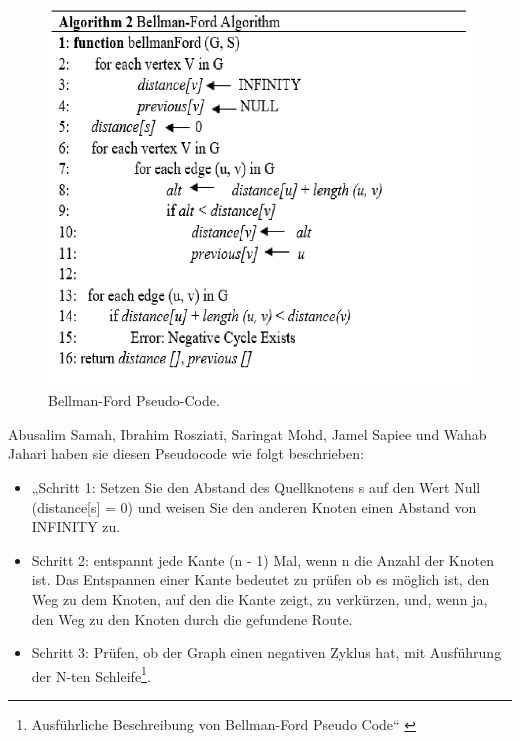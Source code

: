  \begin{figure}[H]
	\centering
	\includegraphics[width=1.0\textwidth]{images/Bellman-Ford-Algorithmus_Pseudo-Code.PNG}
	\caption{\label{fig:Bellman}Bellman-Ford Pseudo-Code\cite{Abusalim2020}.}
\end{figure}
Abusalim Samah, Ibrahim Rosziati, Saringat Mohd, Jamel Sapiee und Wahab Jahari haben sie diesen Pseudocode wie folgt beschrieben:
\newline
\newline
\begin{itemize}
	\item   „Schritt 1: Setzen Sie den Abstand des Quellknotens s auf den Wert Null (distance[s] = 0) und weisen Sie den anderen Knoten einen Abstand von INFINITY zu. 
	\item Schritt 2: entspannt jede Kante (n - 1) Mal, wenn n die Anzahl der Knoten ist. Das Entspannen einer Kante bedeutet zu prüfen ob es möglich ist, den Weg zu dem Knoten, auf den die Kante zeigt, zu verkürzen, und, wenn ja, den Weg zu den Knoten durch die gefundene Route. 
	\item Schritt 3: Prüfen, ob der Graph einen negativen Zyklus hat, mit Ausführung der N-ten Schleife\footnote{Ausführliche Beschreibung von Bellman-Ford Pseudo Code“ \cite{Abusalim2020}}.
\end{itemize}







